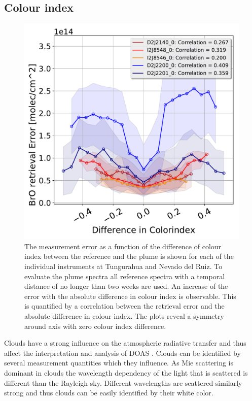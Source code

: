 \subsection{ Colour index}
\begin{figure}
	\centering
	\includegraphics[width=0.7\linewidth]{Bilder/DiffColidxallInstruments}
	\caption[The  measurement error as a function of the difference of colour index between the reference and the plume is shown for each of the individual instruments at Tungurahua and Nevado del Ruiz.]{The  measurement error as a function of the difference of colour index between the reference and the plume is shown for each of the individual instruments at Tungurahua and Nevado del Ruiz. To evaluate the plume spectra all reference spectra with a temporal distance of no longer than two weeks are used. An increase of the  error with the absolute difference in colour index is observable. This is quantified by a correlation between the  retrieval error and the absolute difference in colour index. The plots reveal a symmetry around axis with zero colour index difference. }
	\label{fig:diffcolidx}
\end{figure}
Clouds  have  a  strong  influence  on  the  atmospheric  radiative  transfer  and  thus  affect  the  interpretation  and  analysis of DOAS \citep{wagner2014cloud}.
Clouds can be identified by several measurement quantities which they influence.
As Mie scattering is dominant in clouds the wavelength dependency of the light that is scattered is different than the Rayleigh sky. Different wavelengths are scattered similarly strong and thus clouds can be easily identified by their white color.
